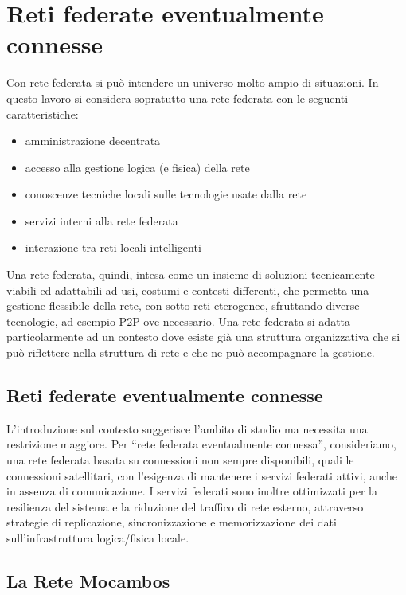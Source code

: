 
\chapter{Reti federate eventualmente connesse}
\label{Capitolo2}

Con rete federata si può intendere un universo molto ampio di
situazioni. In questo lavoro si considera sopratutto una rete federata
con le seguenti caratteristiche:

\begin{itemize}
  \item amministrazione decentrata 
  \item accesso alla gestione logica (e fisica) della rete
  \item conoscenze tecniche locali sulle tecnologie usate dalla rete
  \item servizi interni alla rete federata
  \item interazione tra reti locali intelligenti
\end{itemize} 

Una rete federata, quindi, intesa come un insieme di soluzioni
tecnicamente viabili ed adattabili ad usi, costumi e contesti
differenti, che permetta una gestione flessibile della rete, con
sotto-reti eterogenee, sfruttando diverse tecnologie, ad esempio P2P
ove necessario. Una rete federata si adatta particolarmente ad un
contesto dove esiste già una struttura organizzativa che si può
riflettere nella struttura di rete e che ne può accompagnare la
gestione.

\section{Reti federate eventualmente connesse}
L'introduzione sul contesto suggerisce l'ambito di studio ma necessita
una restrizione maggiore. Per ``rete federata eventualmente
connessa'', consideriamo, una rete federata basata su connessioni non
sempre disponibili, quali le connessioni satellitari, con l'esigenza
di mantenere i servizi federati attivi, anche in assenza di
comunicazione. I servizi federati sono inoltre ottimizzati per la
resilienza del sistema e la riduzione del traffico di rete esterno,
attraverso strategie di replicazione, sincronizzazione e
memorizzazione dei dati sull'infrastruttura logica/fisica locale.

\section{La Rete Mocambos}
\label{sec:ReteMocambos}

